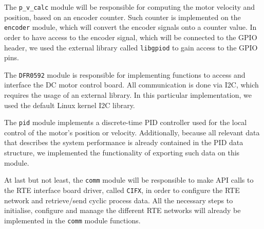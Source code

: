 The \verb|p_v_calc| module will be responsible for computing the motor velocity and position, based on an encoder counter.
Such counter is implemented on the \verb|encoder| module, which will convert the encoder signals onto a counter value.
In order to have access to the encoder signal, which will be connected to the GPIO header, we used the external library called \verb|libgpiod| to gain access to the GPIO pins.

The \verb|DFR0592| module is responsible for implementing functions to access and interface the DC motor control board.
All communication is done via I2C, which requires the usage of an external library.
In this particular implementation, we used the default Linux kernel I2C library.

The \verb|pid| module implements a discrete-time PID controller used for the local control of the motor's position or velocity.
Additionally, because all relevant data that describes the system performance is already contained in the PID data structure, we implemented the functionality of exporting such data on this module.

At last but not least, the \verb|comm| module will be responsible to make API calls to the RTE interface board driver, called \verb|CIFX|, in order to configure the RTE network and retrieve/send cyclic process data.
All the necessary steps to initialise, configure and manage the different RTE networks will already be implemented in the \verb|comm| module functions.
